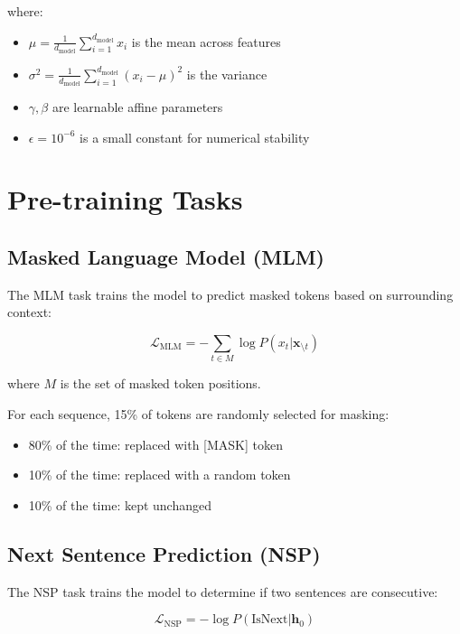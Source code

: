 \documentclass[11pt,a4paper]{article}
\begin{document}
where:
\begin{itemize}
    \item $\mu = \frac{1}{d_{\text{model}}}\sum_{i=1}^{d_{\text{model}}} x_i$ is the mean across features
    \item $\sigma^2 = \frac{1}{d_{\text{model}}}\sum_{i=1}^{d_{\text{model}}} (x_i - \mu)^2$ is the variance
    \item $\gamma, \beta$ are learnable affine parameters
    \item $\epsilon = 10^{-6}$ is a small constant for numerical stability
\end{itemize}

\section{Pre-training Tasks}

\subsection{Masked Language Model (MLM)}

The MLM task trains the model to predict masked tokens based on surrounding context:

\begin{equation}
\mathcal{L}_{\text{MLM}} = -\sum_{t \in M} \log P(x_t | \mathbf{x}_{\setminus t})
\end{equation}

where $M$ is the set of masked token positions.

For each sequence, 15\% of tokens are randomly selected for masking:
\begin{itemize}
    \item 80\% of the time: replaced with [MASK] token
    \item 10\% of the time: replaced with a random token
    \item 10\% of the time: kept unchanged
\end{itemize}

\subsection{Next Sentence Prediction (NSP)}

The NSP task trains the model to determine if two sentences are consecutive:

\begin{equation}
\mathcal{L}_{\text{NSP}} = -\log P(\text{IsNext} | \mathbf{h}_0)
\end{equation}
\end{document}
